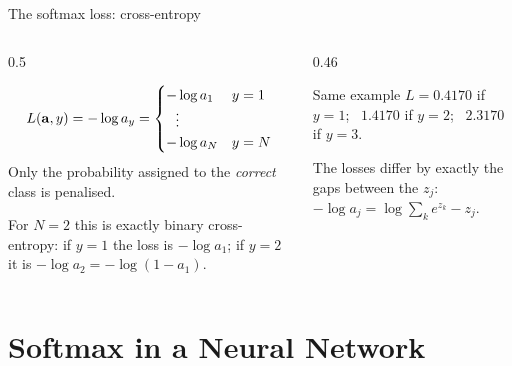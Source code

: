 \documentclass[aspectratio=169,10pt]{beamer}
\begin{document}
\begin{frame}{The softmax loss: cross-entropy}
  \begin{columns}[T,onlytextwidth]
    \begin{column}{0.5\textwidth}
      \begin{defnbox}
        \small
        \[ L(\mathbf{a},y) = -\log a_y =
           \begin{cases}-\log a_1 & y=1\\ \ \ \vdots\\ -\log a_N & y=N\end{cases} \]
        Only the probability assigned to the \emph{correct} class is penalised.
      \end{defnbox}
      \footnotesize
      For $N=2$ this is exactly binary cross-entropy: if $y=1$ the loss is $-\log a_1$; if
      $y=2$ it is $-\log a_2=-\log(1-a_1)$.
    \end{column}
    \begin{column}{0.46\textwidth}
      \par
      \footnotesize
      \begin{block}{Same example}
        $L=0.4170$ if $y=1$; \ $1.4170$ if $y=2$; \ $2.3170$ if $y=3$.\par
        The losses differ by exactly the gaps between the $z_j$: \
        $-\log a_j=\log\sum_k e^{z_k}-z_j$.
      \end{block}
    \end{column}
  \end{columns}
\end{frame}

\section{Softmax in a Neural Network}
\end{document}
